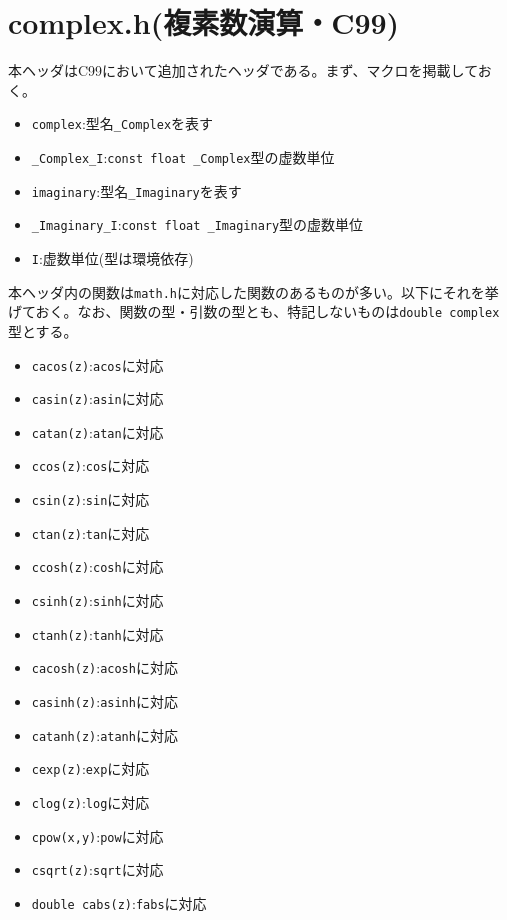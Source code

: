 \section{complex.h(複素数演算・C99)}
本ヘッダはC99において追加されたヘッダである。まず、マクロを掲載しておく。
\begin{itemize}
\item \verb|complex|:型名\verb|_Complex|を表す
\item \verb|_Complex_I|:\verb|const float _Complex|型の虚数単位
\item \verb|imaginary|:型名\verb|_Imaginary|を表す
\item \verb|_Imaginary_I|:\verb|const float _Imaginary|型の虚数単位
\item \verb|I|:虚数単位(型は環境依存)
\end{itemize}
本ヘッダ内の関数は\verb|math.h|に対応した関数のあるものが多い。以下にそれを挙げておく。なお、関数の型・引数の型とも、特記しないものは\verb|double complex|型とする。
\begin{multicols}{2}
\begin{itemize}
\item \verb|cacos(z)|:\verb|acos|に対応
\item \verb|casin(z)|:\verb|asin|に対応
\item \verb|catan(z)|:\verb|atan|に対応
\item \verb|ccos(z)|:\verb|cos|に対応
\item \verb|csin(z)|:\verb|sin|に対応
\item \verb|ctan(z)|:\verb|tan|に対応
\item \verb|ccosh(z)|:\verb|cosh|に対応
\item \verb|csinh(z)|:\verb|sinh|に対応
\item \verb|ctanh(z)|:\verb|tanh|に対応
\item \verb|cacosh(z)|:\verb|acosh|に対応
\item \verb|casinh(z)|:\verb|asinh|に対応
\item \verb|catanh(z)|:\verb|atanh|に対応
\item \verb|cexp(z)|:\verb|exp|に対応
\item \verb|clog(z)|:\verb|log|に対応
\item \verb|cpow(x,y)|:\verb|pow|に対応
\item \verb|csqrt(z)|:\verb|sqrt|に対応
\item \verb|double cabs(z)|:\verb|fabs|に対応
\end{itemize}
\end{multicols}
